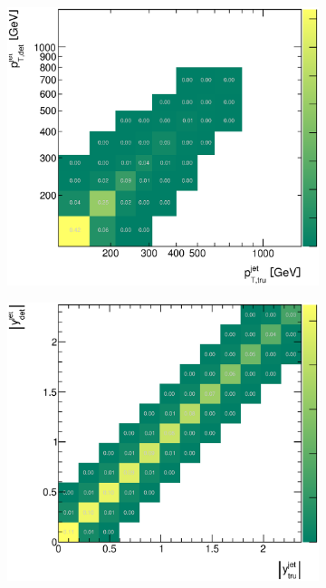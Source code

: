 \documentclass[12pt, twoside]{article}
\numberwithin{equation}{section}
\numberwithin{figure}{section}
\newenvironment{changemargin}[2]{%
\begin{list}{}{%
\setlength{\topsep}{0pt}%
\setlength{\leftmargin}{#1}%
\setlength{\rightmargin}{#2}%
\setlength{\listparindent}{\parindent}%
\setlength{\itemindent}{\parindent}%
\setlength{\parsep}{\parskip}%
}%
\item[]}{\end{list}}
\begin{document}
\begin{figure}
\begin{changemargin}{-1.0cm}{-0.75cm}
\begin{changemargin}{-0.75cm}{-1.0cm}
        \vspace{0.2cm}
        \begin{subfigure}[b]{0.37\textwidth}
            \includegraphics[width=\textwidth]{./images/CorrelationMatricesPythia/REC_vs_HAD(DP+FP)-104.eps}
            \subcaption{}
            \label{fig:PythiaCorrelationPtJet}
        \end{subfigure}
        \begin{subfigure}[b]{0.37\textwidth}
            \includegraphics[width=\textwidth]{./images/CorrelationMatricesPythia/REC_vs_HAD(DP+FP)-105.eps}

\end{subfigure}
\end{changemargin}
\end{changemargin}
\end{figure}
\end{document}

